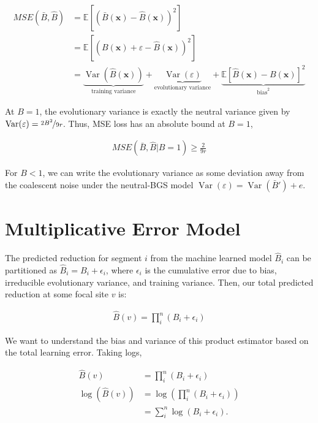 \documentclass[11pt]{article}
\newcommand{\E}{\mathbb{E}}
\DeclareMathOperator{\var}{Var}
\begin{document}
\begin{align}
  MSE(\bar{B}, \hat{B}) &= \E[(\bar{B}(\mathbf{x}) - \hat{B}(\mathbf{x}))^2] \\
                        &= \E[(B(\mathbf{x}) + \varepsilon - \hat{B}(\mathbf{x}))^2] \\
                        &= \underbrace{\var(\hat{B}(\mathbf{x}))}_\text{training variance} + 
                      \underbrace{\var(\varepsilon)}_\text{evolutionary variance} + \underbrace{\E[\hat{B}(\mathbf{x}) - B(\mathbf{x})]^2}_{\mathrm{bias}^2}
\end{align}

At $B=1$, the evolutionary variance is exactly the neutral variance given by
$\var(\varepsilon) = \nicefrac{2B^2}{9r}$. Thus, MSE loss has an absolute bound at
$B=1$,

\begin{align}
  MSE(\bar{B}, \hat{B} | B = 1) \ge \frac{2}{9r}
\end{align}

For $B < 1$, we can write the evolutionary variance as some deviation
away from the coalescent noise under the neutral-BGS model $\var(\varepsilon) =
\var(\bar{B}') + e$.




\section*{Multiplicative Error Model}

The predicted reduction for segment $i$ from the machine learned model
$\hat{B}_i$ can be partitioned as $\hat{B}_i = B_i + \epsilon_i$, where
$\epsilon_i$ is the cumulative error due to bias, irreducible evolutionary
variance, and training variance. Then, our total predicted reduction at some
focal site $v$ is:

\begin{align}
  \hat{B}(v) = \prod_i^n (B_i + \epsilon_i)
\end{align}

We want to understand the bias and variance of this product estimator based on
the total learning error. Taking logs, 

\begin{align}
  \hat{B}(v) &= \prod_i^n (B_i + \epsilon_i) \\
  \log(\hat{B}(v)) &= \log\left(\prod_i^n (B_i + \epsilon_i) \right) \\
                   &= \sum_i^n \log(B_i + \epsilon_i).
\end{align}
\end{document}
